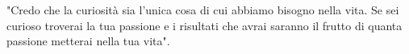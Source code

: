 \begin{dedica}
	"Credo che la curiosità sia l'unica cosa di cui abbiamo bisogno nella vita. Se sei curioso troverai la tua passione e i risultati che avrai saranno il frutto di quanta passione metterai nella tua vita".
\end{dedica}